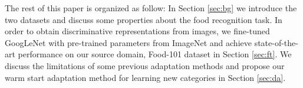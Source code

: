 The rest of this paper is organized as follow: In Section \ref{sec:bg} we introduce the two datasets and discuss some properties about the food recognition task. In order to obtain discriminative representations from images, we fine-tuned GoogLeNet with pre-trained parameters from ImageNet and achieve state-of-the-art performance on our source domain, Food-101 dataset in Section \ref{sec:ft}. We discuss the limitations of some previous adaptation methods and propose our warm start adaptation method for learning new categories in Section \ref{sec:da}.
